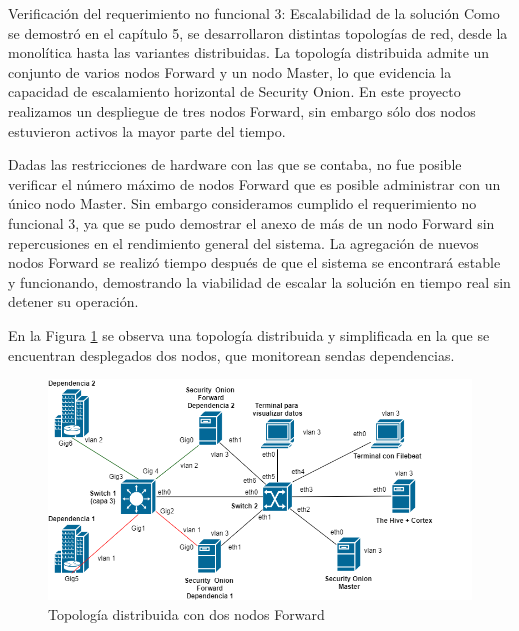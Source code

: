     \begin{section}{Verificación del requerimiento no funcional 3: Escalabilidad de la solución}
    Como se demostró en el capítulo 5, se desarrollaron distintas topologías de red, desde la monolítica hasta las variantes distribuidas. La topología distribuida admite un conjunto de varios nodos Forward y un nodo Master, lo que evidencia la capacidad de escalamiento horizontal de Security Onion. En este proyecto realizamos un despliegue de tres nodos Forward, sin embargo sólo dos nodos estuvieron activos la mayor parte del tiempo.\par
    Dadas las restricciones de hardware con las que se contaba, no fue posible verificar el número máximo de nodos Forward que es posible administrar con un único nodo Master. Sin embargo consideramos cumplido el requerimiento no funcional 3, ya que se pudo demostrar el anexo de más de un nodo Forward sin repercusiones en el rendimiento general del sistema. La agregación de nuevos nodos Forward se realizó tiempo después de que el sistema se encontrará estable y funcionando, demostrando la viabilidad de escalar la solución en tiempo real sin detener su operación.\par
    En la Figura \ref{fig:iter2_topo_dist} se observa una topología distribuida y simplificada en la que se encuentran desplegados dos nodos, que monitorean sendas dependencias.
    \begin{figure}[H]
    \centering
        \includegraphics[width=1\textwidth]{./iteracion_2_imagenes/figura_9_topologia_de_prueba_5.png}
        \caption{Topología distribuida con dos nodos Forward}
        \label{fig:iter2_topo_dist}
    \end{figure}

    \end{section}
\label{iteracion2}
